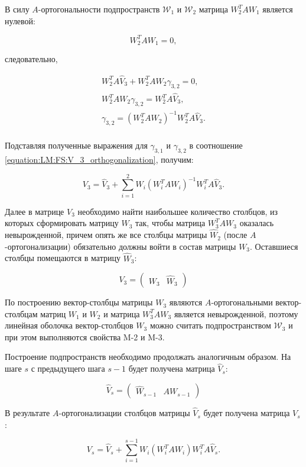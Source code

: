 В силу $A$-ортогональности подпространств $\mathcal W_1$ и $\mathcal W_2$ матрица $W_2^T A W_1$ является нулевой:

$$
	W_2^T A W_1 = 0,
$$

следовательно,

$$
	\begin{array}{c}
 		W_2^T A \widehat{V}_3 + W_2^T A W_2 \gamma_{3,2} = 0, \\
 		W_2^T A W_2 \gamma_{3,2} = W_2^T A \widehat{V}_3, \\
 		\gamma_{3,2} = \left ( W_2^T A W_2 \right ) ^{-1} W_2^T A \widehat{V}_3. \\
	\end{array}
$$

Подставляя полученные выражения для $\gamma_{3,1}$ и $\gamma_{3,2}$ в соотношение \ref{equation:LM:FS:V_3_orthogonalization}, получим:

$$
	V_3 = \widehat{V}_3 + \sum_{i=1}^2 W_i \left ( W_i^T A W_i \right ) ^{-1} W_i^T A \widehat{V}_3.
$$

Далее в матрице $V_3$ необходимо найти наибольшее количество столбцов, из которых сформировать матрицу $W_3$ так, чтобы матрица
$W_3^T A W_3$ оказалась невырожденной, причем опять же все столбцы матрицы $\widehat{W}_2$ (после $A$-ортогонализации) обязательно должны
войти в состав матрицы $W_3$. Оставшиеся столбцы помещаются в матрицу $\widehat{W}_3$:

$$
	V_3 =
		\begin{pmatrix}
			W_3 & \widehat{W}_3
		\end{pmatrix}
$$

По построению вектор-столбцы матрицы $W_3$ являются $A$-ортогональными вектор-столбцам матриц $W_1$ и $W_2$ и матрица $W_3^T A W_3$
является невырожденной, поэтому линейная оболочка вектор-столбцов $W_3$ можно считать подпространством $\mathcal W_3$ и при этом выполняются
свойства M-2 и M-3.

Построение подпространств необходимо продолжать аналогичным образом. На шаге $s$ с предыдущего шага $s-1$ будет получена матрица
$\widehat{V}_s$:

$$
	\widehat{V}_s =
		\begin{pmatrix}
			\widehat{W}_{s-1} & A W_{s-1}
		\end{pmatrix}
$$

В результате $A$-ортогонализации столбцов матрицы $\widehat{V}_s$ будет получена матрица $V_s$:

\begin{equation} \label{equation:LM:FS:V_s_orthogonalization}
	V_s = \widehat{V}_s + \sum_{i=1}^{s-1} W_i \left ( W_i^T A W_i \right ) W_i^T A \widehat{V}_s.
\end{equation}


